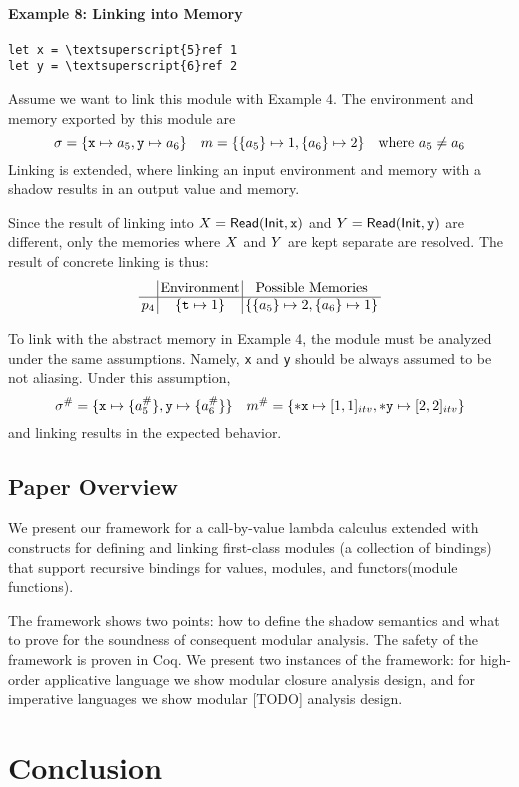 \documentclass{article}
\begin{document}
\paragraph{Example 8: Linking into Memory}
\begin{center}
  \begin{BVerbatim}[commandchars=\\\{\}]
let x = \textsuperscript{5}ref 1
let y = \textsuperscript{6}ref 2
  \end{BVerbatim}
\end{center}

Assume we want to link this module with Example 4.
The environment and memory exported by this module are
\[\sigma=\{\texttt{x}\mapsto a_5,\texttt{y}\mapsto a_6\}\quad m=\{\{a_5\}\mapsto 1,\{a_6\}\mapsto 2\}\quad\text{where }a_5\neq a_6\]
Linking is extended, where linking an input environment and memory
with a shadow results in an output value and memory.

Since the result of linking into ${X}=\mathsf{Read}(\mathsf{Init},\texttt{x})$ and
${Y}=\mathsf{Read}(\mathsf{Init},\texttt{y})$ are different,
only the memories where ${X}$ and ${Y}$ are kept
separate are resolved.
The result of concrete linking is thus:
\[
  \setlength{\arraycolsep}{2pt}
  \begin{array}{c|c|c}
              & \text{Environment}      & \text{Possible Memories}              \\
    \hline
    \ppoint_4 & \{\texttt{t}\mapsto 1\} & \{\{a_5\}\mapsto 2,\{a_6\}\mapsto 1\}
  \end{array}
\]

To link with the abstract memory in Example 4, the module
must be analyzed under the same assumptions.
Namely, \texttt{x} and \texttt{y} should be always assumed
to be not aliasing.
Under this assumption,
\[
  {\sigma}^{\#}=\{\texttt{x}\mapsto\{{a}^{\#}_5\},\texttt{y}\mapsto\{{a}^{\#}_6\}\}\quad
  {m}^{\#}=\{*\texttt{x}\mapsto[1,1]_{{itv}},*\texttt{y}\mapsto[2,2]_{{itv}}\}
\]
and linking results in the expected behavior.

\subsection{Paper Overview}
We present our framework for a call-by-value lambda calculus extended
with constructs for defining and linking first-class modules (a
collection of bindings) that support recursive bindings for values,
modules, and functors(module functions).

The framework shows two points: how to define the shadow semantics and
what to prove for the soundness of consequent modular analysis. The
safety of the framework is proven in Coq. We present two instances of the
framework: for high-order applicative language we show modular
closure analysis design, and for imperative languages we show modular
  [TODO] analysis design.

\clearpage

\clearpage

\clearpage


\section{Conclusion}
\end{document}
